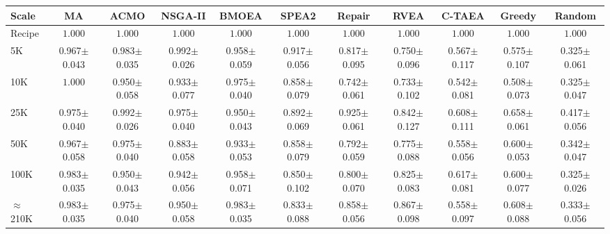 \begin{tabular}{@{}lcccccccccc@{}}
\toprule
Scale & MA & ACMO & NSGA-II & BMOEA & SPEA2 & Repair & RVEA & C-TAEA & Greedy & Random \\
\midrule
Recipe & $\mathbf{1.000}$ & $\mathbf{1.000}$ & $\mathbf{1.000}$ & $\mathbf{1.000}$ & $\mathbf{1.000}$ & $\mathbf{1.000}$ & $\mathbf{1.000}$ & $\mathbf{1.000}$ & $\mathbf{1.000}$ & $\mathbf{1.000}$ \\
\midrule
5K & 0.967$\pm$0.043 & 0.983$\pm$0.035 & 0.992$\pm$0.026 & 0.958$\pm$0.059 & 0.917$\pm$0.056 & 0.817$\pm$0.095 & 0.750$\pm$0.096 & 0.567$\pm$0.117 & 0.575$\pm$0.107 & 0.325$\pm$0.061 \\
10K & $\mathbf{1.000}$ & 0.950$\pm$0.058 & 0.933$\pm$0.077 & 0.975$\pm$0.040 & 0.858$\pm$0.079 & 0.742$\pm$0.061 & 0.733$\pm$0.102 & 0.542$\pm$0.081 & 0.508$\pm$0.073 & 0.325$\pm$0.047 \\
25K & 0.975$\pm$0.040 & 0.992$\pm$0.026 & 0.975$\pm$0.040 & 0.950$\pm$0.043 & 0.892$\pm$0.069 & 0.925$\pm$0.061 & 0.842$\pm$0.127 & 0.608$\pm$0.111 & 0.658$\pm$0.061 & 0.417$\pm$0.056 \\
50K & 0.967$\pm$0.058 & 0.975$\pm$0.040 & 0.883$\pm$0.058 & 0.933$\pm$0.053 & 0.858$\pm$0.079 & 0.792$\pm$0.059 & 0.775$\pm$0.088 & 0.558$\pm$0.056 & 0.600$\pm$0.053 & 0.342$\pm$0.047 \\
100K & 0.983$\pm$0.035 & 0.950$\pm$0.043 & 0.942$\pm$0.056 & 0.958$\pm$0.071 & 0.850$\pm$0.102 & 0.800$\pm$0.070 & 0.825$\pm$0.083 & 0.617$\pm$0.081 & 0.600$\pm$0.077 & 0.325$\pm$0.026 \\
$\approx$210K & 0.983$\pm$0.035 & 0.975$\pm$0.040 & 0.950$\pm$0.058 & 0.983$\pm$0.035 & 0.833$\pm$0.088 & 0.858$\pm$0.056 & 0.867$\pm$0.098 & 0.558$\pm$0.097 & 0.608$\pm$0.088 & 0.333$\pm$0.056 \\
\bottomrule
\end{tabular}